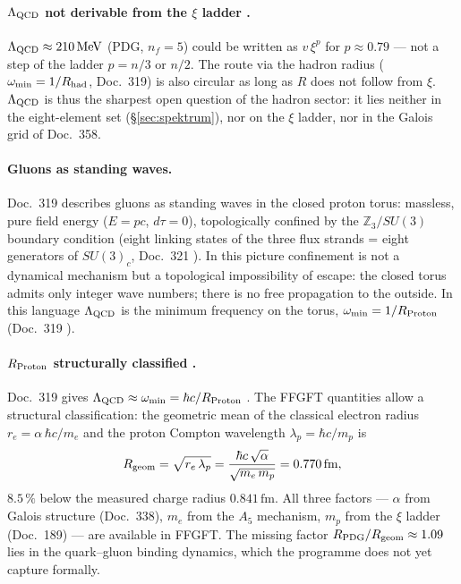 \paragraph{$\Lambda_{\rm QCD}$ not derivable from the $\xi$ ladder \XM.}
$\Lambda_{\rm QCD} \approx 210\,\text{MeV}$ (PDG, $n_f = 5$) could be written
as $v\,\xi^p$ for $p \approx 0.79$ --- not a step of the ladder $p = n/3$ or
$n/2$. The route via the hadron radius ($\omega_{\min} = 1/R_{\rm had}$,
Doc.~319) is also circular as long as $R$ does not follow from $\xi$.
$\Lambda_{\rm QCD}$ is thus the sharpest open question of the hadron sector:
it lies neither in the eight-element set (§\ref{sec:spektrum}), nor on the
$\xi$ ladder, nor in the Galois grid of Doc.~358.

\paragraph{Gluons as standing waves.}
Doc.~319 describes gluons as standing waves in the closed proton torus:
massless, pure field energy ($E = pc$, $d\tau = 0$), topologically confined
by the $\mathbb Z_3/SU(3)$ boundary condition (eight linking states of the
three flux strands = eight generators of $SU(3)_c$, Doc.~321 \BM). In this
picture confinement is not a dynamical mechanism but a topological
impossibility of escape: the closed torus admits only integer wave numbers;
there is no free propagation to the outside. In this language
$\Lambda_{\rm QCD}$ is the minimum frequency on the torus,
$\omega_{\min} = 1/R_{\rm Proton}$ (Doc.~319 \SM).

\paragraph{$R_{\rm Proton}$ structurally classified \SM.}
Doc.~319 gives $\Lambda_{\rm QCD} \approx \omega_{\min} = \hbar c/R_{\rm Proton}$
\SM. The FFGFT quantities allow a structural classification: the geometric
mean of the classical electron radius $r_e = \alpha\,\hbar c/m_e$ and the
proton Compton wavelength $\lambda_p = \hbar c/m_p$ is
\[
  R_{\rm geom} = \sqrt{r_e\,\lambda_p}
  = \frac{\hbar c\,\sqrt{\alpha}}{\sqrt{m_e\,m_p}}
  = 0.770\,\text{fm},
\]
$8.5\,\%$ below the measured charge radius $0.841\,\text{fm}$. All three
factors --- $\alpha$ from Galois structure (Doc.~338), $m_e$ from the $A_5$
mechanism, $m_p$ from the $\xi$ ladder (Doc.~189) --- are available in FFGFT.
The missing factor $R_{\rm PDG}/R_{\rm geom} \approx 1.09$ lies in the
quark--gluon binding dynamics, which the programme does not yet capture
formally.

